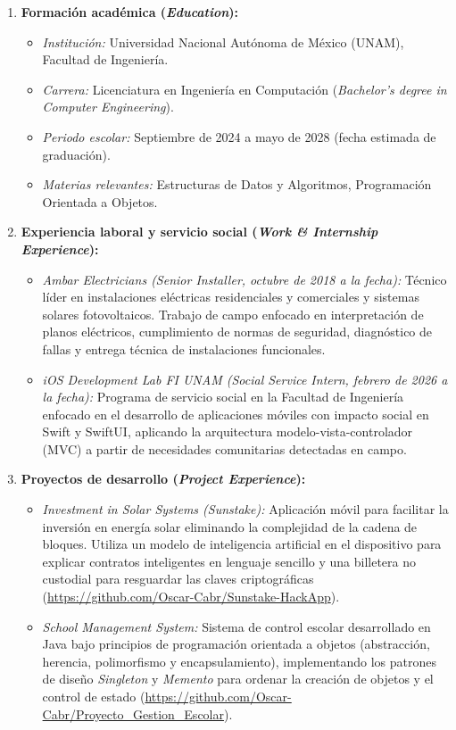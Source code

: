 \documentclass[12pt]{article}
\begin{document}
\begin{enumerate}[leftmargin=0.25in, itemsep=0.35em]
    \item \textbf{Formación académica (\textit{Education}):}
    \begin{itemize}[leftmargin=0.15in, noitemsep]
        \item \textit{Institución:} Universidad Nacional Autónoma de México (UNAM), Facultad de Ingeniería.
        \item \textit{Carrera:} Licenciatura en Ingeniería en Computación (\textit{Bachelor's degree in Computer Engineering}).
        \item \textit{Periodo escolar:} Septiembre de 2024 a mayo de 2028 (fecha estimada de graduación).
        \item \textit{Materias relevantes:} Estructuras de Datos y Algoritmos, Programación Orientada a Objetos.
    \end{itemize}

    \item \textbf{Experiencia laboral y servicio social (\textit{Work \& Internship Experience}):}
    \begin{itemize}[leftmargin=0.15in, noitemsep]
        \item \textit{Ambar Electricians (Senior Installer, octubre de 2018 a la fecha):} Técnico líder en instalaciones eléctricas residenciales y comerciales y sistemas solares fotovoltaicos. Trabajo de campo enfocado en interpretación de planos eléctricos, cumplimiento de normas de seguridad, diagnóstico de fallas y entrega técnica de instalaciones funcionales.
        \item \textit{iOS Development Lab FI UNAM (Social Service Intern, febrero de 2026 a la fecha):} Programa de servicio social en la Facultad de Ingeniería enfocado en el desarrollo de aplicaciones móviles con impacto social en Swift y SwiftUI, aplicando la arquitectura modelo-vista-controlador (MVC) a partir de necesidades comunitarias detectadas en campo.
    \end{itemize}

    \item \textbf{Proyectos de desarrollo (\textit{Project Experience}):}
    \begin{itemize}[leftmargin=0.15in, noitemsep]
        \item \textit{Investment in Solar Systems (Sunstake):} Aplicación móvil para facilitar la inversión en energía solar eliminando la complejidad de la cadena de bloques. Utiliza un modelo de inteligencia artificial en el dispositivo para explicar contratos inteligentes en lenguaje sencillo y una billetera no custodial para resguardar las claves criptográficas (\url{https://github.com/Oscar-Cabr/Sunstake-HackApp}).
        \item \textit{School Management System:} Sistema de control escolar desarrollado en Java bajo principios de programación orientada a objetos (abstracción, herencia, polimorfismo y encapsulamiento), implementando los patrones de diseño \textit{Singleton} y \textit{Memento} para ordenar la creación de objetos y el control de estado (\url{https://github.com/Oscar-Cabr/Proyecto_Gestion_Escolar}).
    \end{itemize}


\end{enumerate}
\end{document}
